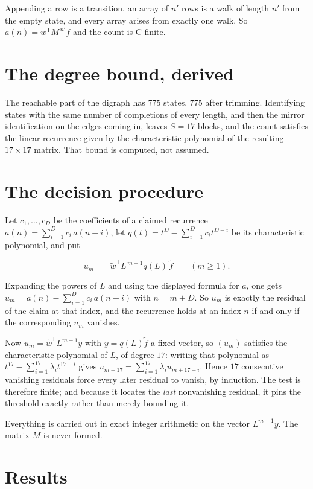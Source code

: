 \documentclass[11pt]{article}
\theoremstyle{definition}
\begin{document}
Appending a row is a transition, an array of $n'$ rows is a walk of length $n'$ from the empty state, and every array arises from exactly one walk. So $a(n) = w^{\mathsf T}M^{\,n'}f$ and the count is C-finite.

\section{The degree bound, derived}

The reachable part of the digraph has $775$ states, $775$ after trimming. Identifying states with the same number of completions of every length, and then the mirror identification on the edges coming in, leaves $S = 17$ blocks, and the count satisfies the linear recurrence given by the characteristic polynomial of the resulting $17\times17$ matrix. That bound is computed, not assumed.

\section{The decision procedure}

Let $c_1,\dots,c_D$ be the coefficients of a claimed recurrence $a(n) = \sum_{i=1}^{D} c_i\,a(n-i)$, let $q(t) = t^{D} - \sum_{i=1}^{D} c_i t^{D-i}$ be its characteristic polynomial, and put

\[u_m \;=\; \tilde w^{\mathsf T} L^{\,m-1} q(L)\,\tilde f \qquad (m \ge 1).\]

Expanding the powers of $L$ and using the displayed formula for $a$, one gets $u_m = a(n) - \sum_{i=1}^{D} c_i\,a(n-i)$ with $n = m + D$. So $u_m$ is exactly the residual of the claim at that index, and the recurrence holds at an index $n$ if and only if the corresponding $u_m$ vanishes.

Now $u_m = \tilde w^{\mathsf T} L^{m-1} y$ with $y = q(L)\tilde f$ a fixed vector, so $(u_m)$ satisfies the characteristic polynomial of $L$, of degree $17$: writing that polynomial as $t^{17} - \sum_{i=1}^{17} \lambda_i t^{17-i}$ gives $u_{m+17} = \sum_{i=1}^{17} \lambda_i u_{m+17-i}$. Hence $17$ consecutive vanishing residuals force every later residual to vanish, by induction. The test is therefore finite; and because it locates the {\itshape last} nonvanishing residual, it pins the threshold exactly rather than merely bounding it.

Everything is carried out in exact integer arithmetic on the vector $L^{m-1}y$. The matrix $M$ is never formed.

\section{Results}
\end{document}
